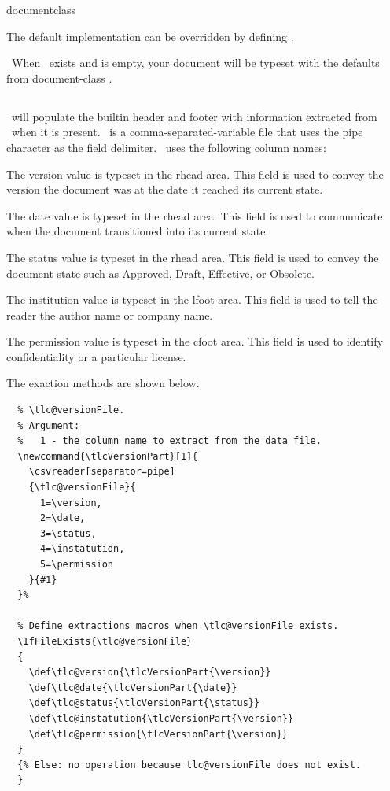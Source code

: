 documentclass\documentclass[12pt]{tlc-article}
\begin{document}
The default implementation can be overridden by defining \tlcHF. 

\tlcNote\ When \tlcHF\ exists and is empty, your document will be typeset
with the defaults from document-class .


\clearpage
\subsection{\tlcVE} \label{sec:version}
\tlcA\ will populate the builtin header and footer with information extracted
from \tlcVE\ when it is present.  \tlcVE\ is a comma-separated-variable file
that uses the pipe character as the field delimiter.  \tlcVE\ uses the following
column names:

\begin{description}[style=nextline]
  \item[version] The version value is typeset in the rhead area.  This field is
    used to convey the version the document was at the date it reached its
    current state.

  \item[date] The date value is typeset in the rhead area.  This field is used
    to communicate when the document transitioned into its current state.

  \item[status] The status value is typeset in the rhead area.  This field is
    used to convey the document state such as Approved, Draft, Effective, or
    Obsolete.

  \item[instatution] The institution value is typeset in the lfoot area.  This
    field is used to tell the reader the author name or company name.

  \item[permission]  The permission value is typeset in the cfoot area.  This
    field is used to identify confidentiality or a particular license. 

\end{description}

The exaction methods are shown below.
\begin{lstlisting}[basicstyle=\tiny]
  % Extract document status, document date and document version from
  % \tlc@versionFile.
  % Argument:
  %   1 - the column name to extract from the data file.
  \newcommand{\tlcVersionPart}[1]{
    \csvreader[separator=pipe]
    {\tlc@versionFile}{
      1=\version,
      2=\date,
      3=\status,
      4=\instatution,
      5=\permission
    }{#1}
  }%

  % Define extractions macros when \tlc@versionFile exists.
  \IfFileExists{\tlc@versionFile}
  { 
    \def\tlc@version{\tlcVersionPart{\version}}
    \def\tlc@date{\tlcVersionPart{\date}}
    \def\tlc@status{\tlcVersionPart{\status}}
    \def\tlc@instatution{\tlcVersionPart{\version}}
    \def\tlc@permission{\tlcVersionPart{\version}}
  }
  {% Else: no operation because tlc@versionFile does not exist. 
  }
\end{lstlisting}
\end{document}
